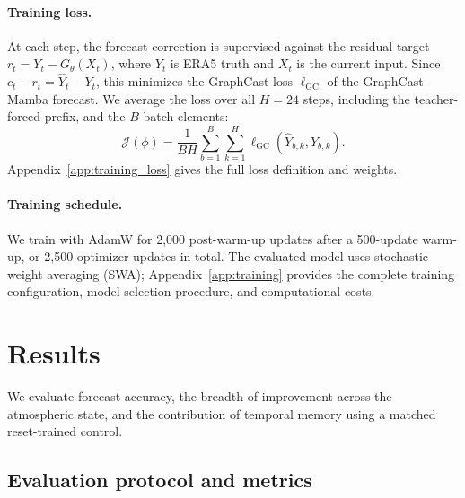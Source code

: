 \documentclass{article}
\newcommand{\vfourchange}[1]{{\color{blue}#1}}
\newcommand{\vfourred}[1]{{\color{red}#1}}
\newif\ifvfivechanges
\newcommand{\vfiveidentity}[1]{#1}
\DeclareRobustCommand{\vfiveadded}[1]{\ifvfivechanges{\color{vfiveAdded}%
  \let\vfourchange\vfiveidentity\let\vfourred\vfiveidentity#1}\else{\color{blue}%
  \let\vfourchange\vfiveidentity\let\vfourred\vfiveidentity#1}\fi}
\begin{document}
\paragraph{Training loss.}
At each step, the forecast correction is supervised against the residual target $r_t=Y_t-G_\theta(X_t)$, where $Y_t$ is ERA5 truth and $X_t$ is the current input. Since $c_t-r_t=\hat{Y}_t-Y_t$, this minimizes the {GraphCast loss} $\ell_{\mathrm{GC}}$ of the GraphCast--Mamba forecast. We average the loss over all $H=24$ steps, including the teacher-forced prefix, and the $B$ batch elements:
\begin{equation}
    \mathcal{J}(\phi)
    =\frac{1}{BH}\sum_{b=1}^{B}\sum_{k=1}^{H}
      \ell_{\mathrm{GC}}(\hat{Y}_{b,k},Y_{b,k}).
    \label{eq:training_objective}
\end{equation}
Appendix~\ref{app:training_loss} gives the full loss definition and weights.

\paragraph{Training schedule.}
We train with AdamW for 2,000 post-warm-up updates after a 500-update warm-up, or 2,500 optimizer updates in total. The evaluated model uses stochastic weight averaging (SWA); Appendix~\ref{app:training} \vfourchange{provides the complete training configuration, model-selection procedure, and computational costs.}


\section{Results}
\label{sec:numerical}

\ifvfivechanges
\par\begingroup\color{vfiveDeleted}\noindent
\sout{We evaluate whether GraphCast--Mamba, with its correction branch trained on seven years of ERA5 data (2015--2021), improves on the frozen GraphCast backbone forecasts, how broadly the gains extend across the atmospheric state, and whether temporal memory contributes beyond the correction branch's additional capacity. To assess the latter, we compare against a matched control trained and evaluated with memory reset at every step.}
\par\endgroup
\fi
\vfiveadded{We evaluate forecast accuracy, the breadth of improvement across the atmospheric state, and the contribution of temporal memory using a matched reset-trained control.}

\subsection{Evaluation protocol and metrics}
\label{sec:eval_protocol}
\end{document}

